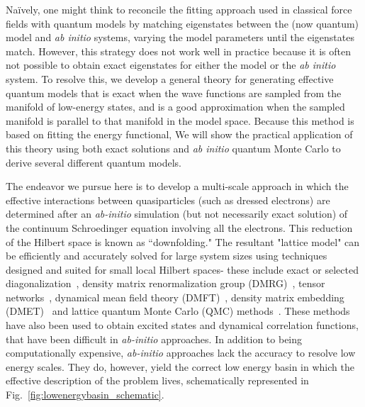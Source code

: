 Na\"ively, one might think to reconcile the fitting approach used in classical force fields with quantum models by matching eigenstates between the (now quantum) model and {\it ab initio} systems, varying the model parameters until the eigenstates match. 
However, this strategy does not work well in practice because it is often not possible to obtain exact eigenstates for either the model or the {\it ab initio} system.
To resolve this, we develop a general theory for generating effective quantum models that is exact when the wave functions are sampled from the manifold of low-energy states, and is a good approximation when the sampled manifold is parallel to that manifold in the model space. 
Because this method is based on fitting the energy functional, 
We will show the practical application of this theory using both exact solutions and {\it ab initio} quantum Monte Carlo to derive several different quantum models.


The endeavor we pursue here is to develop a multi-scale approach in which the effective interactions between quasiparticles (such as dressed electrons) are determined after an \textit{ab-initio} simulation (but not necessarily exact solution) of the continuum Schroedinger equation involving all the electrons. 
This reduction of the Hilbert space is known as ``downfolding."
The resultant "lattice model" can be efficiently and accurately solved for large system sizes using techniques designed and suited for small local Hilbert spaces- these include exact or selected diagonalization~\cite{DeRaedt,Tubman_selci,Holmes_Tubman_Umrigar}, density matrix renormalization group (DMRG)~\cite{White1992}, tensor networks~\cite{PEPS,Changlani_CPS,NeuscammanCPS}, dynamical mean field theory (DMFT)~\cite{Kotliar2006}, density matrix embedding (DMET)~\cite{DMET_2012} and lattice quantum Monte Carlo (QMC) methods~\cite{Scalapino, Trivedi_Ceperley, Zhang_AFQMC, Sandvik_loops, Prokofiev, Booth2009,SQMC,Holmes_Changlani_Umrigar, Booth2013}. 
These methods have also been used to obtain excited states and dynamical correlation functions, that have been difficult in \textit{ab-initio} approaches. 
In addition to being computationally expensive, \textit{ab-initio} approaches lack the accuracy to resolve low energy scales. 
They do, however, yield the correct low energy basin in which the effective description of the problem lives, schematically represented in Fig.~\ref{fig:lowenergybasin_schematic}.


